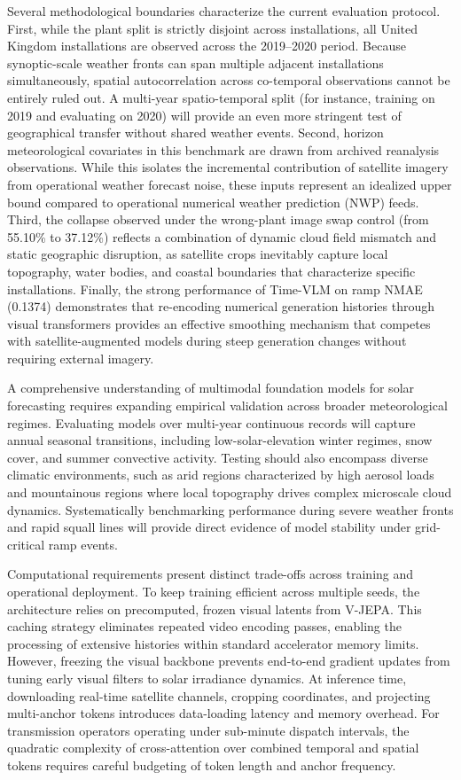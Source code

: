 Several methodological boundaries characterize the current evaluation protocol. First, while the plant split is strictly disjoint across installations, all United Kingdom installations are observed across the 2019--2020 period. Because synoptic-scale weather fronts can span multiple adjacent installations simultaneously, spatial autocorrelation across co-temporal observations cannot be entirely ruled out. A multi-year spatio-temporal split (for instance, training on 2019 and evaluating on 2020) will provide an even more stringent test of geographical transfer without shared weather events. Second, horizon meteorological covariates in this benchmark are drawn from archived reanalysis observations. While this isolates the incremental contribution of satellite imagery from operational weather forecast noise, these inputs represent an idealized upper bound compared to operational numerical weather prediction (NWP) feeds. Third, the collapse observed under the wrong-plant image swap control (from 55.10\% to 37.12\%) reflects a combination of dynamic cloud field mismatch and static geographic disruption, as satellite crops inevitably capture local topography, water bodies, and coastal boundaries that characterize specific installations. Finally, the strong performance of Time-VLM on ramp NMAE (0.1374) demonstrates that re-encoding numerical generation histories through visual transformers provides an effective smoothing mechanism that competes with satellite-augmented models during steep generation changes without requiring external imagery.

A comprehensive understanding of multimodal foundation models for solar forecasting requires expanding empirical validation across broader meteorological regimes. Evaluating models over multi-year continuous records will capture annual seasonal transitions, including low-solar-elevation winter regimes, snow cover, and summer convective activity. Testing should also encompass diverse climatic environments, such as arid regions characterized by high aerosol loads and mountainous regions where local topography drives complex microscale cloud dynamics. Systematically benchmarking performance during severe weather fronts and rapid squall lines will provide direct evidence of model stability under grid-critical ramp events.

Computational requirements present distinct trade-offs across training and operational deployment. To keep training efficient across multiple seeds, the architecture relies on precomputed, frozen visual latents from V-JEPA. This caching strategy eliminates repeated video encoding passes, enabling the processing of extensive histories within standard accelerator memory limits. However, freezing the visual backbone prevents end-to-end gradient updates from tuning early visual filters to solar irradiance dynamics. At inference time, downloading real-time satellite channels, cropping coordinates, and projecting multi-anchor tokens introduces data-loading latency and memory overhead. For transmission operators operating under sub-minute dispatch intervals, the quadratic complexity of cross-attention over combined temporal and spatial tokens requires careful budgeting of token length and anchor frequency.

